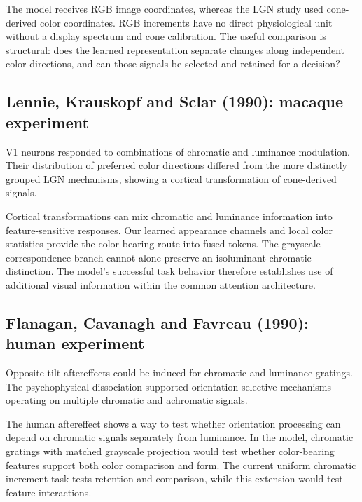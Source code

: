 \documentclass[11pt]{article}
\begin{document}
The model receives RGB image coordinates, whereas the LGN study used cone-derived color coordinates. RGB increments have no direct physiological unit without a display spectrum and cone calibration. The useful comparison is structural: does the learned representation separate changes along independent color directions, and can those signals be selected and retained for a decision?

\subsection{Lennie, Krauskopf and Sclar (1990): macaque experiment}
V1 neurons responded to combinations of chromatic and luminance modulation. Their distribution of preferred color directions differed from the more distinctly grouped LGN mechanisms, showing a cortical transformation of cone-derived signals. \cite{bio_lennie}

Cortical transformations can mix chromatic and luminance information into feature-sensitive responses. Our learned appearance channels and local color statistics provide the color-bearing route into fused tokens. The grayscale correspondence branch cannot alone preserve an isoluminant chromatic distinction. The model’s successful task behavior therefore establishes use of additional visual information within the common attention architecture.

\subsection{Flanagan, Cavanagh and Favreau (1990): human experiment}
Opposite tilt aftereffects could be induced for chromatic and luminance gratings. The psychophysical dissociation supported orientation-selective mechanisms operating on multiple chromatic and achromatic signals. \cite{bio_flanagan}

The human aftereffect shows a way to test whether orientation processing can depend on chromatic signals separately from luminance. In the model, chromatic gratings with matched grayscale projection would test whether color-bearing features support both color comparison and form. The current uniform chromatic increment task tests retention and comparison, while this extension would test feature interactions.
\end{document}
